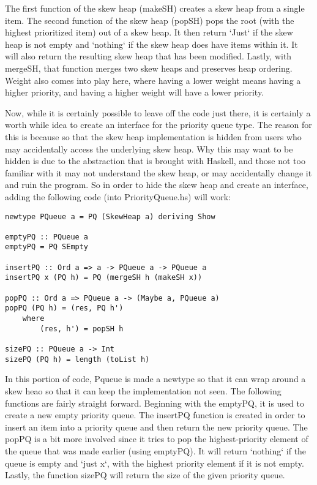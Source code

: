 \documentclass{article}
\begin{document}
The first function of the skew heap (makeSH) creates a skew heap from a single item.
The second function of the skew heap (popSH) pops the root (with the highest prioritized item) out of a skew heap.
It then return `Just` if the skew heap is not empty and `nothing` if the skew heap does have items within it. It will also return the resulting skew heap that has been modified.
Lastly, with mergeSH, that function merges two skew heaps and preserves heap ordering. 
Weight also comes into play here, where having a lower weight means having a higher priority, and having a higher weight will have a lower priority.
\medskip\noindent

Now, while it is certainly possible to leave off the code just there, it is certainly a worth while idea to create an interface for the priority queue type.
The reason for this is because so that the skew heap implementation is hidden from users who may accidentally access the underlying skew heap.
Why this may want to be hidden is due to the abstraction that is brought with Haskell, and those not too familiar with it may not understand the skew heap, or may accidentally change it and ruin the program.
So in order to hide the skew heap and create an interface, adding the following code (into PriorityQueue.hs) will work:
\begin{lstlisting}
newtype PQueue a = PQ (SkewHeap a) deriving Show

emptyPQ :: PQueue a
emptyPQ = PQ SEmpty

insertPQ :: Ord a => a -> PQueue a -> PQueue a
insertPQ x (PQ h) = PQ (mergeSH h (makeSH x))

popPQ :: Ord a => PQueue a -> (Maybe a, PQueue a)
popPQ (PQ h) = (res, PQ h')
    where 
        (res, h') = popSH h

sizePQ :: PQueue a -> Int
sizePQ (PQ h) = length (toList h)
\end{lstlisting}
In this portion of code, Pqueue is made a newtype so that it can wrap around a skew heao so that it can keep the implementation not seen.
The following functions are fairly straight forward.
Beginning with the emptyPQ, it is used to create a new empty priority queue.
The insertPQ function is created in order to insert an item into a priority queue and then return the new priority queue.
The popPQ is a bit more involved since it tries to pop the highest-priority element of the queue that was made earlier (using emptyPQ). It will return `nothing` if the queue is empty and `just x`, with the highest priority element if it is not empty.
Lastly, the function sizePQ will return the size of the given priority queue.
\medskip\noindent
\end{document}
